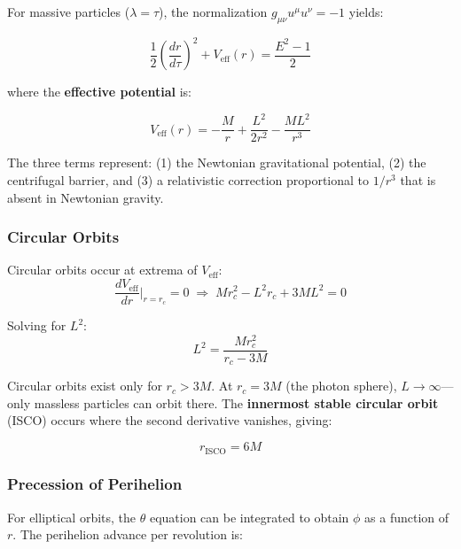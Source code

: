 \documentclass[12pt]{article}
\theoremstyle{definition}
\theoremstyle{remark}
\begin{document}
For massive particles ($\lambda = \tau$), the normalization $g_{\mu\nu}u^{\mu}u^{\nu} = -1$ yields:

\begin{equation}\label{eq:orbital-eq}
  \frac{1}{2}\left(\frac{dr}{d\tau}\right)^{2} + V_{\text{eff}}(r) = \frac{E^{2} - 1}{2}
\end{equation}

where the \textbf{effective potential} is:

\begin{equation}\label{eq:eff-potential}
  V_{\text{eff}}(r) = -\frac{M}{r} + \frac{L^{2}}{2r^{2}} - \frac{ML^{2}}{r^{3}}
\end{equation}

The three terms represent: (1) the Newtonian gravitational potential, (2) the centrifugal barrier, and (3) a relativistic correction proportional to $1/r^{3}$ that is absent in Newtonian gravity.

\subsubsection{Circular Orbits}

Circular orbits occur at extrema of $V_{\text{eff}}$:
\begin{equation}
  \frac{dV_{\text{eff}}}{dr}\bigg|_{r=r_{c}} = 0
  \;\Longrightarrow\;
  Mr_{c}^{2} - L^{2}r_{c} + 3ML^{2} = 0
\end{equation}

Solving for $L^{2}$:
\begin{equation}
  L^{2} = \frac{Mr_{c}^{2}}{r_{c} - 3M}
\end{equation}

Circular orbits exist only for $r_{c} > 3M$. At $r_{c} = 3M$ (the photon sphere), $L \to \infty$---only massless particles can orbit there. The \textbf{innermost stable circular orbit} (ISCO) occurs where the second derivative vanishes, giving:

\begin{equation}
  r_{\text{ISCO}} = 6M
\end{equation}

\subsubsection{Precession of Perihelion}

For elliptical orbits, the $\theta$ equation can be integrated to obtain $\phi$ as a function of $r$. The perihelion advance per revolution is:
\end{document}
